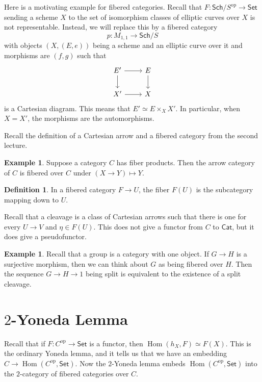 \documentclass[leqno, openany]{memoir}
\theoremstyle{definition}
\newtheorem{defn}[thm]{Definition}
\newtheorem{exm}[thm]{Example}
\theoremstyle{remark}
\theoremstyle{plain}
\theoremstyle{definition}
\theoremstyle{remark}
\newcommand{\mr}[1]{\mathrm{#1}}
\newcommand{\ms}[1]{\mathsf{#1}}
\DeclareMathOperator{\Hom}{Hom}
\begin{document}
Here is a motivating example for fibered categories. Recall that $F \colon
\ms{Sch}/S^{\mr{op}} \to \ms{Set}$ sending a scheme $X$ to the set of
isomorphism classes of elliptic curves over $X$ is not representable. Instead,
we will replace this by a fibered category \[ p \colon M_{1,1} \to \ms{Sch}/S
\] with objects $(X, (E,e))$ being a scheme and an elliptic curve over it and
morphisms are $(f,g)$ such that \begin{equation*} \begin{tikzcd} E' \arrow{r}
\arrow{d} & E \arrow{d} \\ X' \arrow{r} & X \end{tikzcd} \end{equation*} is a
Cartesian diagram. This means that $E' \simeq E \times_X X'$. In particular,
when $X = X'$, the morphisms are the automorphisms.

Recall the definition of a Cartesian arrow and a fibered category from the
second lecture. 

\begin{exm} Suppose a category $C$ has fiber products. Then the arrow category
of $C$ is fibered over $C$ under $(X \to Y) \mapsto Y$.  \end{exm}

\begin{defn} In a fibered category $F \to U$, the fiber $F(U)$ is the
subcategory mapping down to $U$.  \end{defn}

Recall that a cleavage is a class of Cartesian arrows such that there is one
for every $U \to V$ and $\eta \in F(U)$. This does not give a functor from $C$
to $\ms{Cat}$, but it does give a pseudofunctor. 

\begin{exm} Recall that a group is a category with one object. If $G \to H$ is
    a surjective morphism, then we can think about $G$ as being fibered over
    $H$. Then the sequence $G \to H \to 1$ being split is equivalent to the
    existence of a split cleavage.  \end{exm}

\section{$2$-Yoneda Lemma}%

Recall that if $F \colon C^{\mr{op}} \to \ms{Set}$ is a functor, then
$\Hom(h_X, F) \simeq F(X)$. This is the ordinary Yoneda lemma, and it tells us
that we have an embedding $C \to \Hom(C^{\mr{op}}, \ms{Set})$. Now the
$2$-Yoneda lemma embeds $\Hom(C^{\mr{op}}, \ms{Set})$ into the $2$-category of
fibered categories over $C$.
\end{document}
